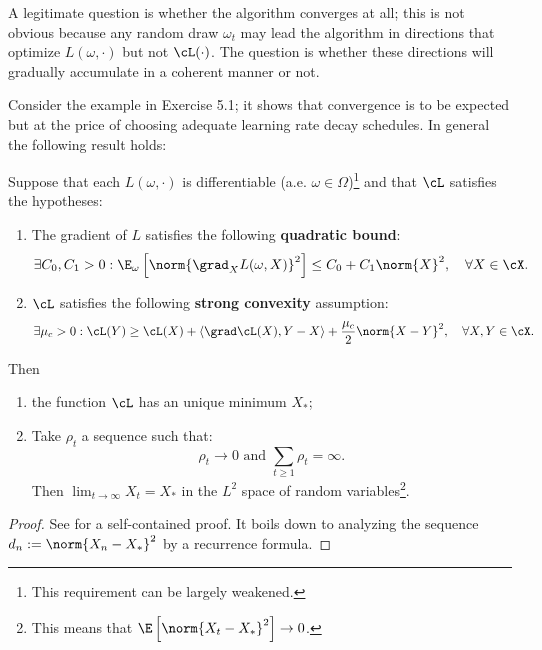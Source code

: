A legitimate question is whether the algorithm converges at all; this is not obvious because any random draw $\omega_t$ may lead the algorithm in directions that optimize $L(\omega, \cdot)$ but not $\cL(\cdot)$. The question is whether these directions will gradually accumulate in a coherent manner or not.

Consider the example in Exercise 5.1; it shows that convergence is to be expected but at the price of choosing adequate learning rate decay schedules. In general the following result holds:

\begin{theorem}\label{thm:ch5-sgd-convergence}
Suppose that each $L(\omega, \cdot)$ is differentiable (a.e. $\omega \in \Omega$)\footnote{This requirement can be largely weakened.} and that $\cL$ satisfies the hypotheses:
\begin{enumerate}
    \item The gradient of $L$ satisfies the following \textbf{quadratic bound}:
    \begin{equation}\label{eq:ch5-quadratic-bound}
    \exists C_0, C_1 > 0 : \E_\omega\left[\norm{\grad_X L(\omega, X)}^2\right] \leq C_0 + C_1 \norm{X}^2, \quad \forall X \in \cX.
    \end{equation}
    \item $\cL$ satisfies the following \textbf{strong convexity} assumption:
    \begin{equation}\label{eq:ch5-strong-convexity}
    \exists \mu_c > 0 : \cL(Y) \geq \cL(X) + \langle \grad \cL(X), Y - X\rangle + \frac{\mu_c}{2} \norm{X - Y}^2, \quad \forall X, Y \in \cX.
    \end{equation}
\end{enumerate}
Then
\begin{enumerate}
    \item the function $\cL$ has an unique minimum $X_*$;
    \item Take $\rho_t$ a sequence such that:
    \begin{equation}\label{eq:ch5-learning-rate-schedule}
    \rho_t \to 0 \text{ and } \sum_{t \geq 1} \rho_t = \infty.
    \end{equation}
    Then $\lim_{t \to \infty} X_t = X_*$ in the $L^2$ space of random variables\footnote{This means that $\E\left[\norm{X_t - X_*}^2\right] \to 0$.}.
\end{enumerate}
\end{theorem}

\begin{proof}
See \cite{turinici22} for a self-contained proof. It boils down to analyzing the sequence $d_n := \norm{X_n - X_*}^2$ by a recurrence formula.
\end{proof}


